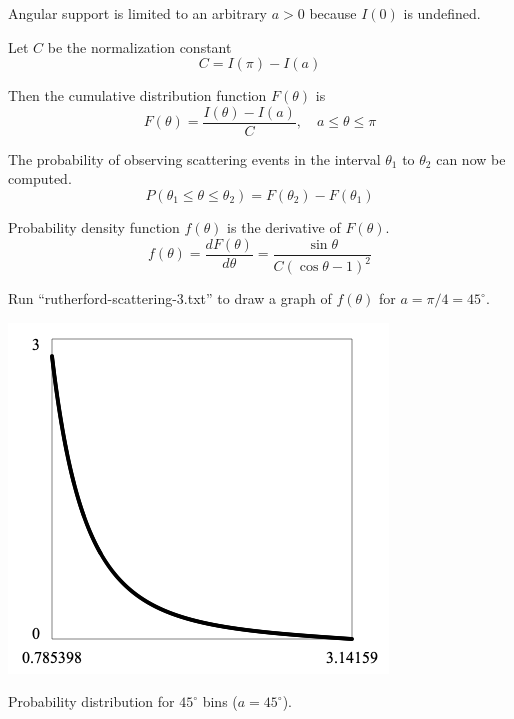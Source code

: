 \documentclass[12pt]{article}
\begin{document}
\noindent
Angular support is limited to an arbitrary $a>0$ because $I(0)$ is undefined.

\bigskip
\noindent
Let $C$ be the normalization constant
\begin{equation*}
C=I(\pi)-I(a)
\end{equation*}

\noindent
Then the cumulative distribution function $F(\theta)$ is
\begin{equation*}
F(\theta)=\frac{I(\theta)-I(a)}{C},
\quad a\le\theta\le\pi
\end{equation*}

\noindent
The probability of observing scattering events
in the interval $\theta_1$ to $\theta_2$ can now be computed.
\begin{equation*}
P(\theta_1\le\theta\le\theta_2)=F(\theta_2)-F(\theta_1)
\end{equation*}

\noindent
Probability density function $f(\theta)$ is the derivative of $F(\theta)$.
\begin{equation*}
f(\theta)=\frac{dF(\theta)}{d\theta}
=\frac{\sin\theta}{C(\cos\theta-1)^2}
\end{equation*}

\noindent
Run ``rutherford-scattering-3.txt'' to draw a graph of $f(\theta)$ for $a=\pi/4=45^\circ$.

\begin{center}
\includegraphics[scale=0.5]{rutherford-scattering-1.png}
\end{center}

\noindent
Probability distribution for $45^\circ$ bins ($a=45^\circ$).
\end{document}
